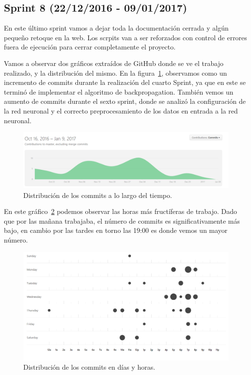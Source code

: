 \subsection{Sprint 8 (22/12/2016 - 09/01/2017)}
En este último sprint vamos a dejar toda la documentación cerrada y algún pequeño retoque en la web.
Los scrpits van a ser reforzados con control de errores fuera de ejecución para cerrar completamente el proyecto.

Vamos a observar dos gráficos extraídos de GitHub donde se ve el trabajo realizado, y la distribución del mismo. En la figura~\ref{fig:Commits}, observamos como un incremento de commits durante la realización del cuarto Sprint, ya que en este se terminó de implementar el algoritmo de backpropagation. También vemos un aumento de commits durante el sexto sprint, donde se analizó la configuración de la red neuronal y el correcto preprocesamiento de los datos en entrada a la red neuronal.

\begin{figure}
\centering
\includegraphics[width=.9\textwidth]{img/commits}
\caption{Distribución de los commits a lo largo del tiempo.}
\label{fig:Commits}
\end{figure}

En este gráfico~\ref{fig:punch_card} podemos observar las horas más fructíferas de trabajo. Dado que por las mañana trabajaba, el número de commits es significativamente más bajo, en cambio por las tardes en torno las 19:00 es donde vemos un mayor número.

\begin{figure}
\centering
\includegraphics[width=.9\textwidth]{img/punch_card}
\caption{Distribución de los commits en días y horas.}
\label{fig:punch_card}
\end{figure}
 



